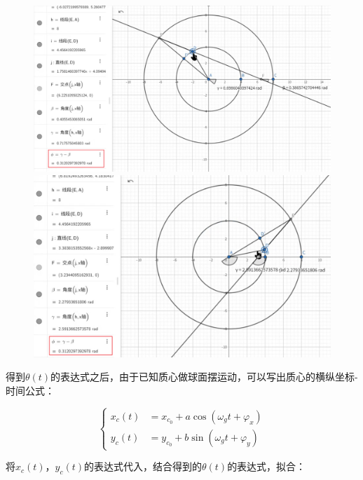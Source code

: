 \documentclass[11pt]{article}
\begin{document}
\begin{figure}[H]
    \centering
    \begin{minipage}[t]{0.48\textwidth}
        \centering
        \includegraphics[width=\linewidth]{Figs/1.png}
    \end{minipage}
    \hfill
    \begin{minipage}[t]{0.48\textwidth}
        \centering
        \includegraphics[width=\linewidth]{Figs/2.png}
    \end{minipage}
\end{figure}

得到$\theta(t)$的表达式之后，由于已知质心做球面摆运动，可以写出质心的横纵坐标-时间公式：

$$\left\{
\begin{aligned}
    x_c(t)&=x_{c_0}+a\cos(\omega_{g}t+\varphi_x) \\
    y_c(t)&=y_{c_0}+b\sin(\omega_{g}t+\varphi_y)
\end{aligned}
\right.$$

将$x_c(t)，y_c(t)$的表达式代入，结合得到的$\theta(t)$的表达式，拟合：
\end{document}
